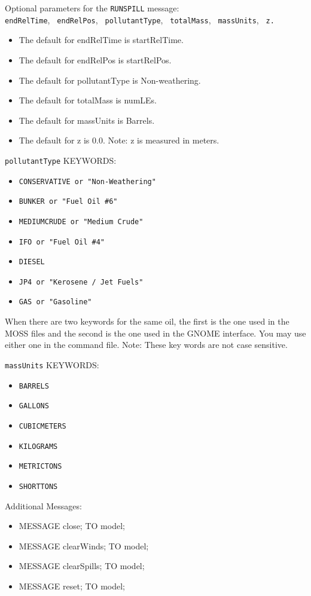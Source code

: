 \documentclass[12pt]{article}      %
\newcommand{\gnome}{\textsf{GNOME}\xspace}
\newcommand{\command}[1]{\texttt{#1}}
\begin{document}
Optional parameters for the \command{RUNSPILL} message:\\
\command{endRelTime}, \command{ endRelPos}, \command{ pollutantType},
\command{ totalMass}, \command{ massUnits}, \command{ z.}
\begin{itemize}
\item The default for endRelTime is startRelTime.
\item The default for endRelPos is startRelPos.
\item The default for pollutantType is Non-weathering.
\item The default for totalMass is numLEs.
\item The default for massUnits is Barrels.
\item The default for z is 0.0. Note: z is measured in meters.
\end{itemize}
\command{pollutantType}  KEYWORDS:
\begin{itemize}
\item \command{CONSERVATIVE or "Non-Weathering"}
\item \command{BUNKER or "Fuel Oil \#6"}
\item \command{MEDIUMCRUDE or "Medium Crude"}
\item \command{IFO or "Fuel Oil \#4"}
\item \command{DIESEL}
\item \command{JP4 or "Kerosene / Jet Fuels"}
\item \command{GAS or "Gasoline"}
\end{itemize}

When there are two keywords for the same oil, the first is the one used
in the MOSS files and the second is the one used in the \gnome interface.
You may use either one in the command file.  Note: These key words are
not case sensitive.

\command{massUnits}  KEYWORDS:
\begin{itemize}
\item \command{BARRELS}
\item \command{GALLONS}
\item \command{CUBICMETERS}
\item \command{KILOGRAMS}
\item \command{METRICTONS}
\item \command{SHORTTONS}
\end{itemize}
Additional Messages:
\begin{itemize}
\item MESSAGE close; TO model; 
\item MESSAGE clearWinds; TO model;
\item MESSAGE clearSpills; TO model;
\item MESSAGE reset; TO model; 
\end{itemize}
\end{document}
